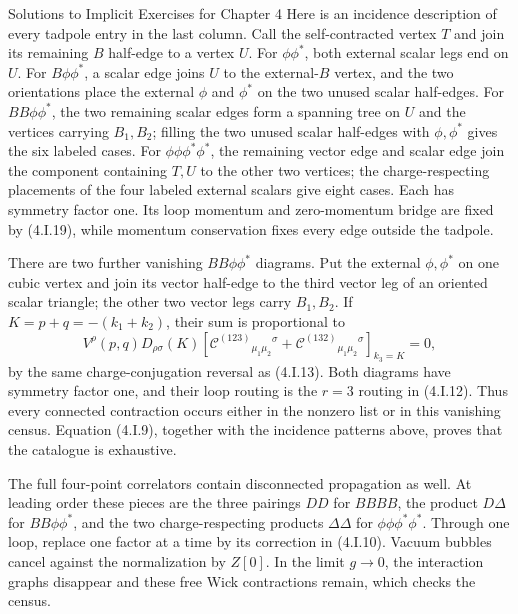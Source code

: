 \begin{bankssolutions}{Solutions to Implicit Exercises for Chapter 4}
Here is an incidence description of every tadpole entry in the last column.
Call the self-contracted vertex $T$ and join its remaining $B$ half-edge to a
vertex $U$.  For $\phi\phi^*$, both external scalar legs end on $U$.  For
$B\phi\phi^*$, a scalar edge joins $U$ to the external-$B$ vertex, and the
two orientations place the external $\phi$ and $\phi^*$ on the two unused
scalar half-edges.  For $BB\phi\phi^*$, the two remaining scalar edges form
a spanning tree on $U$ and the vertices carrying $B_1,B_2$; filling the two
unused scalar half-edges with $\phi,\phi^*$ gives the six labeled cases.  For
$\phi\phi\phi^*\phi^*$, the remaining vector edge and scalar edge join the
component containing $T,U$ to the other two vertices; the charge-respecting
placements of the four labeled external scalars give eight cases.  Each has
symmetry factor one.  Its loop momentum and zero-momentum bridge are fixed by
(4.I.19), while momentum conservation fixes every edge outside the tadpole.

There are two further vanishing $BB\phi\phi^*$ diagrams.  Put the external
$\phi,\phi^*$ on one cubic vertex and join its vector half-edge to the third
vector leg of an oriented scalar triangle; the other two vector legs carry
$B_1,B_2$.  If $K=p+q=-(k_1+k_2)$, their sum is proportional to
\begin{equation*}
 V^\rho(p,q)D_{\rho\sigma}(K)
  \left[\mathcal C^{(123)}{}_{\mu_1\mu_2}{}^\sigma
       +\mathcal C^{(132)}{}_{\mu_1\mu_2}{}^\sigma\right]_{k_3=K}=0,
 \tag{4.I.20}
\end{equation*}
by the same charge-conjugation reversal as (4.I.13).  Both diagrams have
symmetry factor one, and their loop routing is the $r=3$ routing in
(4.I.12).  Thus every connected contraction occurs either in the nonzero
list or in this vanishing census.  Equation (4.I.9), together with the
incidence patterns above, proves that the catalogue is exhaustive.

The full four-point correlators contain disconnected propagation as well.
At leading order these pieces are the three pairings $DD$ for $BBBB$, the
product $D\Delta$ for $BB\phi\phi^*$, and the two charge-respecting products
$\Delta\Delta$ for $\phi\phi\phi^*\phi^*$.  Through one loop, replace one
factor at a time by its correction in (4.I.10).  Vacuum bubbles cancel
against the normalization by $Z[0]$.  In the limit $g\to0$, the interaction
graphs disappear and these free Wick contractions remain, which checks the
census.


\end{bankssolutions}
